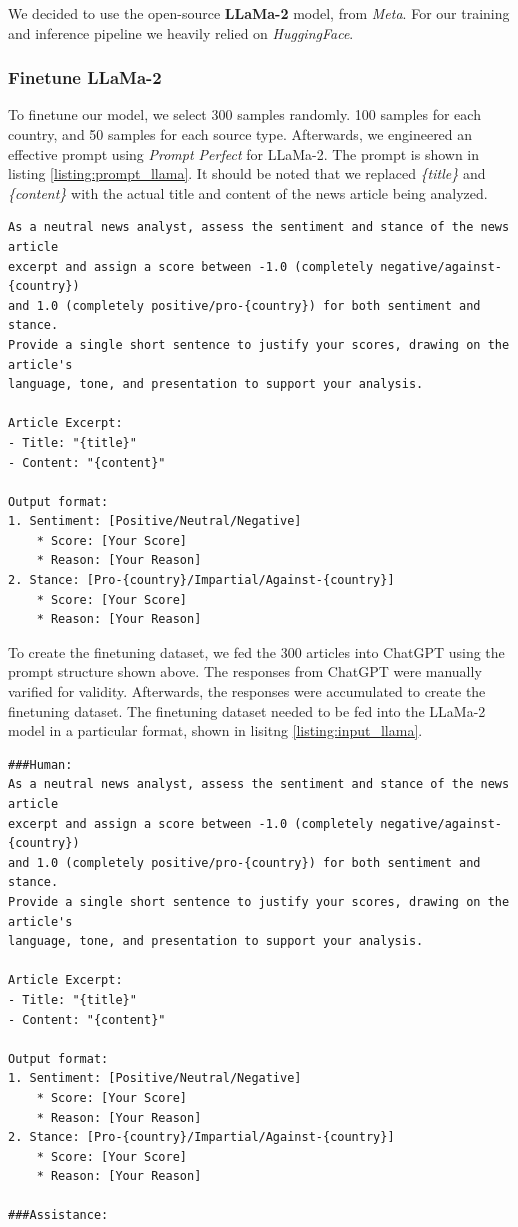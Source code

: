 \documentclass{article}
\theoremstyle{mytheoremstyle}
\theoremstyle{mytheoremstyle}
\theoremstyle{myproblemstyle}
\begin{document}
    We decided to use the open-source \textbf{LLaMa-2} model, from \emph{Meta}. For our training and inference pipeline we heavily relied on \emph{HuggingFace}. \cite{touvron2023llama}

    \subsubsection{Finetune LLaMa-2}

    To finetune our model, we select 300 samples randomly. 100 samples for each country, and 50 samples for each source type. Afterwards, we engineered an effective prompt using \emph{Prompt Perfect} for LLaMa-2. The prompt is shown in listing \ref{listing:prompt_llama}. It should be noted that we replaced \emph{\{title\}} and \emph{\{content\}} with the actual title and content of the news article being analyzed.

    \begin{lstlisting}[caption=Prompt for LLaMa, label={listing:prompt_llama}]
As a neutral news analyst, assess the sentiment and stance of the news article
excerpt and assign a score between -1.0 (completely negative/against-{country}) 
and 1.0 (completely positive/pro-{country}) for both sentiment and stance. 
Provide a single short sentence to justify your scores, drawing on the article's
language, tone, and presentation to support your analysis.

Article Excerpt:
- Title: "{title}"
- Content: "{content}"

Output format: 
1. Sentiment: [Positive/Neutral/Negative]
    * Score: [Your Score]
    * Reason: [Your Reason] 
2. Stance: [Pro-{country}/Impartial/Against-{country}]
    * Score: [Your Score]
    * Reason: [Your Reason]
    \end{lstlisting}
    
    To create the finetuning dataset, we fed the 300 articles into ChatGPT using the prompt structure shown above. The responses from ChatGPT were manually varified for validity. Afterwards, the responses were accumulated to create the finetuning dataset. The finetuning dataset needed to be fed into the LLaMa-2 model in a particular format, shown in lisitng \ref{listing:input_llama}. 

    \begin{lstlisting}[caption=Input for LLaMa, label={listing:input_llama}]
###Human:
As a neutral news analyst, assess the sentiment and stance of the news article
excerpt and assign a score between -1.0 (completely negative/against-{country}) 
and 1.0 (completely positive/pro-{country}) for both sentiment and stance. 
Provide a single short sentence to justify your scores, drawing on the article's
language, tone, and presentation to support your analysis.

Article Excerpt:
- Title: "{title}"
- Content: "{content}"

Output format: 
1. Sentiment: [Positive/Neutral/Negative]
    * Score: [Your Score]
    * Reason: [Your Reason] 
2. Stance: [Pro-{country}/Impartial/Against-{country}]
    * Score: [Your Score]
    * Reason: [Your Reason]

###Assistance:\end{lstlisting}
    
\end{document}
